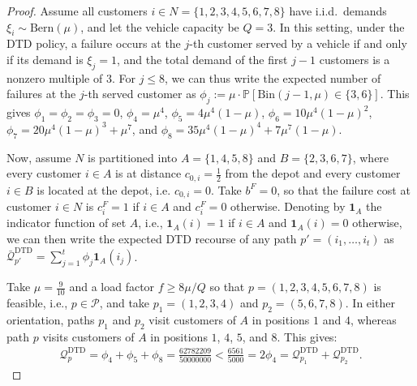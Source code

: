 \documentclass{article}
\newcommand{\rev}[1]{{\color{black}#1}}
\begin{document}
\rev{
\begin{proof}
Assume all customers $i \in N=\{1,2,3,4,5,6,7,8\}$ have i.i.d.\ demands $\xi_i \sim \text{Bern}(\mu)$, and let the vehicle capacity be $Q=3$. In this setting, under the DTD policy, a failure occurs at the $j$-th customer served by a vehicle if and only if its demand is $\xi_j=1$, and the total demand of the first $j-1$ customers is a nonzero multiple of 3. For $j\leq 8$, we can thus write the expected number of failures at the $j$-th served customer as $\phi_j := \mu \cdot \mathbb{P}[\mathrm{Bin}(j-1,\mu) \in \{3,6\} ]$. This gives $\phi_1=\phi_2=\phi_3=0$, $\phi_4=\mu^4$, $\phi_5=4\mu^4(1-\mu)$, $\phi_6=10\mu^4(1-\mu)^2$, $\phi_7=20\mu^4(1-\mu)^3+\mu^7$, and $\phi_8=35\mu^4(1-\mu)^4+7\mu^7(1-\mu)$.

Now, assume $N$ is partitioned into $A=\{1,4,5,8\}$ and $B=\{2,3,6,7\}$, where every customer $i \in A$ is at distance $c_{0,i} = \frac{1}{2}$ from the depot and every customer $i \in B$ is located at the depot, i.e. $c_{0,i} = 0$. Take $b^F=0$, so that the failure cost at customer $i \in N$ is $c^F_i = 1$ if $i \in A$ and $c^F_i = 0$ otherwise. Denoting by $\boldsymbol{1}_{A}$ the indicator function of set $A$, i.e., $\boldsymbol{1}_{A}(i)=1$ if $i \in A$ and $\boldsymbol{1}_{A}(i)=0$ otherwise, we can then write the expected DTD recourse of any path $p'=(i_1,\dots,i_t)$ as $\bar{\mathcal{Q}}_{p'}^{\text{DTD}} = \sum_{j=1}^t \phi_j \boldsymbol{1}_{A}(i_j)$.

Take $\mu=\frac{9}{10}$ and a load factor $f \geq 8\mu/Q$ so that $p=(1,2,3,4,5,6,7,8)$ is feasible, i.e., $p \in \mathcal{P}$, and take $p_1=(1,2,3,4)$ and $p_2=(5,6,7,8)$. In either orientation, paths $p_1$ and $p_2$ visit customers of $A$ in positions $1$ and $4$, whereas path $p$ visits customers of $A$ in positions $1$, $4$, $5$, and $8$. This gives:
\begin{align*}
    \mathcal{Q}^{\mathrm{DTD}}_{p} = \phi_4+\phi_5+\phi_8 = \frac{62782209}{50000000} < \frac{6561}{5000} = 2\phi_4 = \mathcal{Q}^{\mathrm{DTD}}_{p_1} + \mathcal{Q}^{\mathrm{DTD}}_{p_2}.
\end{align*}


\end{proof}}
\end{document}

